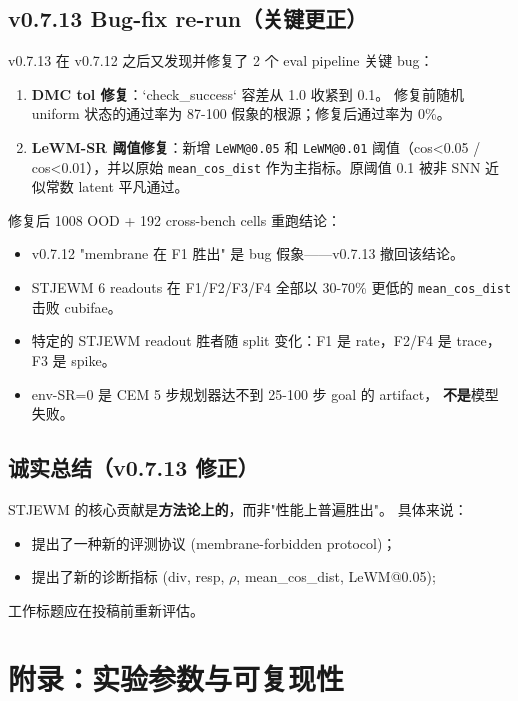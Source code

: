 \documentclass[11pt,a4paper]{article}
\begin{document}
\subsection{v0.7.13 Bug-fix re-run（关键更正）}

v0.7.13 在 v0.7.12 之后又发现并修复了 2 个 eval pipeline 关键 bug：
\begin{enumerate}
    \item \textbf{DMC tol 修复}：`check\_success` 容差从 1.0 收紧到 0.1。
    修复前随机 uniform 状态的通过率为 87-100%
    假象的根源；修复后通过率为 0\%。
    \item \textbf{LeWM-SR 阈值修复}：新增 \texttt{LeWM@0.05} 和 \texttt{LeWM@0.01}
    阈值（cos<0.05 / cos<0.01），并以原始 \texttt{mean\_cos\_dist}
    作为主指标。原阈值 0.1 被非 SNN 近似常数 latent 平凡通过。
\end{enumerate}

修复后 1008 OOD + 192 cross-bench cells 重跑结论：
\begin{itemize}
    \item v0.7.12 "membrane 在 F1 胜出" 是 bug 假象——v0.7.13 撤回该结论。
    \item STJEWM 6 readouts 在 F1/F2/F3/F4 全部以 30-70\% 更低的
    \texttt{mean\_cos\_dist} 击败 cubifae。
    \item 特定的 STJEWM readout 胜者随 split 变化：F1 是 rate，F2/F4 是
    trace，F3 是 spike。
    \item env-SR=0 是 CEM 5 步规划器达不到 25-100 步 goal 的 artifact，
    \textbf{不是}模型失败。
\end{itemize}

\subsection{诚实总结（v0.7.13 修正）}

STJEWM 的核心贡献是\textbf{方法论上的}，而非"性能上普遍胜出"。
具体来说：
\begin{itemize}
    \item 提出了一种新的评测协议 (membrane-forbidden protocol)；
    \item 提出了新的诊断指标 (div, resp, $\rho$, mean\_cos\_dist, LeWM@0.05);
\end{itemize}

工作标题应在投稿前重新评估。

\section{附录：实验参数与可复现性}
\end{document}

